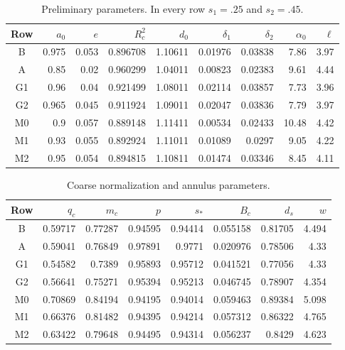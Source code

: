 \begin{table}[ht]
\centering\small
\caption{Preliminary parameters.  In every row $s_1=.25$ and $s_2=.45$.}
\label{bc:preliminary-table}
\begin{tabular}{@{}crrrrrrrr@{}}\toprule
Row&$a_0$&$e$&$R_c^2$&$d_0$&$\delta_1$&$\delta_2$&$\alpha_0$&$\ell$\\\midrule
B & 0.975 & 0.053 & 0.896708 & 1.10611 & 0.01976 & 0.03838 & 7.86 & 3.97\\
A & 0.85 & 0.02 & 0.960299 & 1.04011 & 0.00823 & 0.02383 & 9.61 & 4.44\\
G1 & 0.96 & 0.04 & 0.921499 & 1.08011 & 0.02114 & 0.03857 & 7.73 & 3.96\\
G2 & 0.965 & 0.045 & 0.911924 & 1.09011 & 0.02047 & 0.03836 & 7.79 & 3.97\\
M0 & 0.9 & 0.057 & 0.889148 & 1.11411 & 0.00534 & 0.02433 & 10.48 & 4.42\\
M1 & 0.93 & 0.055 & 0.892924 & 1.11011 & 0.01089 & 0.0297 & 9.05 & 4.22\\
M2 & 0.95 & 0.054 & 0.894815 & 1.10811 & 0.01474 & 0.03346 & 8.45 & 4.11\\
\bottomrule\end{tabular}
\end{table}
\begin{table}[ht]
\centering\small
\caption{Coarse normalization and annulus parameters.}
\label{bc:coarse-table}
\begin{tabular}{@{}crrrrrrr@{}}\toprule
Row&$q_c$&$m_c$&$p$&$s_*$&$B_c$&$d_s$&$w$\\\midrule
B & 0.59717 & 0.77287 & 0.94595 & 0.94414 & 0.055158 & 0.81705 & 4.494\\
A & 0.59041 & 0.76849 & 0.97891 & 0.9771 & 0.020976 & 0.78506 & 4.33\\
G1 & 0.54582 & 0.7389 & 0.95893 & 0.95712 & 0.041521 & 0.77056 & 4.33\\
G2 & 0.56641 & 0.75271 & 0.95394 & 0.95213 & 0.046745 & 0.78907 & 4.354\\
M0 & 0.70869 & 0.84194 & 0.94195 & 0.94014 & 0.059463 & 0.89384 & 5.098\\
M1 & 0.66376 & 0.81482 & 0.94395 & 0.94214 & 0.057312 & 0.86322 & 4.765\\
M2 & 0.63422 & 0.79648 & 0.94495 & 0.94314 & 0.056237 & 0.8429 & 4.623\\
\bottomrule\end{tabular}
\end{table}
